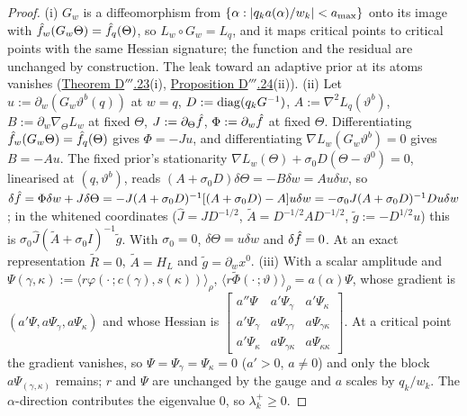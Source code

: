 \begin{proof}
(i) $G_w$ is a diffeomorphism from $\{\alpha : \lvert q_ka(\alpha)/w_k\rvert < a_{\max}\}$ onto its image with
$\hat f_w(G_w\Theta) = \hat f_q(\Theta)$, so $L_w\circ G_w = L_q$, and it maps critical points to critical points with
the same Hessian signature; the function and the residual are unchanged by construction. The leak toward an adaptive
prior at its atoms vanishes (\hyperref[res:thmDppp:23]{Theorem D$'''$.23}(i),
\hyperref[res:thmDppp:24]{Proposition D$'''$.24}(ii)). (ii) Let $u := \partial_w(G_w\vartheta^b(q))$ at $w = q$,
$D := \operatorname{diag}(q_kG^{-1})$, $A := \nabla^2L_q(\vartheta^b)$, $B := \partial_w\nabla_\Theta L_w$ at fixed
$\Theta$, $J := \partial_\Theta\hat f$, $\Phi := \partial_w\hat f$ at fixed $\Theta$. Differentiating
$\hat f_w(G_w\Theta) = \hat f_q(\Theta)$ gives $\Phi = -Ju$, and differentiating $\nabla L_w(G_w\vartheta^b) = 0$ gives
$B = -Au$. The fixed prior's stationarity $\nabla L_w(\Theta) + \sigma_0D(\Theta - \vartheta^0) = 0$, linearised at
$(q,\vartheta^b)$, reads $(A + \sigma_0D)\delta\Theta = -B\delta w = Au\delta w$, so
$\delta\hat f = \Phi\delta w + J\delta\Theta = -J(A + \sigma_0D)^{-1}[(A + \sigma_0D) - A]u\delta w
= -\sigma_0J(A + \sigma_0D)^{-1}Du\delta w$; in the whitened coordinates ($\hat J = JD^{-1/2}$,
$\tilde A = D^{-1/2}AD^{-1/2}$, $\tilde g := -D^{1/2}u$) this is $\sigma_0\hat J(\tilde A + \sigma_0I)^{-1}\tilde g$.
With $\sigma_0 = 0$, $\delta\Theta = u\delta w$ and $\delta\hat f = 0$. At an exact representation $\tilde R = 0$,
$\tilde A = H_L$ and $\tilde g = \partial_wx^0$. (iii) With a scalar amplitude and
$\Psi(\gamma,\kappa) := \langle r\varphi(\cdot\,;c(\gamma),s(\kappa))\rangle_\rho$,
$\langle r\tilde\Phi(\cdot\,;\vartheta)\rangle_\rho = a(\alpha)\Psi$, whose gradient is
$(a'\Psi,a\Psi_\gamma,a\Psi_\kappa)$ and whose Hessian is
$\left[\begin{smallmatrix}a''\Psi & a'\Psi_\gamma & a'\Psi_\kappa\\ a'\Psi_\gamma & a\Psi_{\gamma\gamma}
& a\Psi_{\gamma\kappa}\\ a'\Psi_\kappa & a\Psi_{\gamma\kappa} & a\Psi_{\kappa\kappa}\end{smallmatrix}\right]$. At a
critical point the gradient vanishes, so $\Psi = \Psi_\gamma = \Psi_\kappa = 0$ ($a' > 0$, $a\ne0$) and only the
block $a\Psi_{(\gamma,\kappa)}$ remains; $r$ and $\Psi$ are unchanged by the gauge and $a$ scales by $q_k/w_k$. The
$\alpha$-direction contributes the eigenvalue 0, so $\lambda^+_k\ge0$.
\end{proof}
